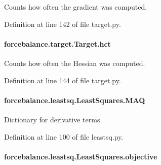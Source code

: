 Counts how often the gradient was computed. 



Definition at line 142 of file target.\-py.

\hypertarget{classforcebalance_1_1target_1_1Target_a5b5a42f78052b47f29ed4b940c6111a1}{
\paragraph[{hct}]{\setlength{\rightskip}{0pt plus 5cm}forcebalance.\-target.\-Target.\-hct\hspace{0.3cm}{\ttfamily [inherited]}}}\label{classforcebalance_1_1target_1_1Target_a5b5a42f78052b47f29ed4b940c6111a1}


Counts how often the Hessian was computed. 



Definition at line 144 of file target.\-py.

\hypertarget{classforcebalance_1_1leastsq_1_1LeastSquares_a7f08641f45285414b080f21ed278f31e}{
\paragraph[{M\-A\-Q}]{\setlength{\rightskip}{0pt plus 5cm}forcebalance.\-leastsq.\-Least\-Squares.\-M\-A\-Q}}\label{classforcebalance_1_1leastsq_1_1LeastSquares_a7f08641f45285414b080f21ed278f31e}


Dictionary for derivative terms. 



Definition at line 100 of file leastsq.\-py.

\hypertarget{classforcebalance_1_1leastsq_1_1LeastSquares_a169fd8ca94e8f36539ec4ccfa0af4902}{
\paragraph[{objective}]{\setlength{\rightskip}{0pt plus 5cm}forcebalance.\-leastsq.\-Least\-Squares.\-objective}}\label{classforcebalance_1_1leastsq_1_1LeastSquares_a169fd8ca94e8f36539ec4ccfa0af4902}


